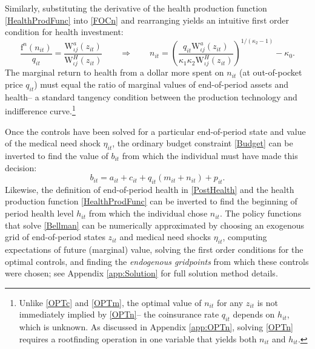 \documentclass[12pt,pdftex,letterpaper]{article}
\newcommand{\Health}{h}
\newcommand{\PostHealth}{H}
\newcommand{\PostValue}{\text{W}}
\newcommand{\Con}{c}
\newcommand{\Care}{m}
\newcommand{\Invst}{n}
\newcommand{\Bank}{b}
\newcommand{\Assets}{a}
\newcommand{\Premium}{p}
\newcommand{\Copay}{q}
\newcommand{\MedShk}{\eta}
\newcommand{\HealthProdFunc}{\text{f}}
\newcommand{\HealthProdParam}{\kappa}
\newcommand{\PostState}{z}
\begin{document}
Similarly, substituting the derivative of the health production function \eqref{HealthProdFunc} into \eqref{FOCn} and rearranging yields an intuitive first order condition for health investment:
\begin{equation}\label{OPTn}
\frac{\HealthProdFunc^\Invst (\Invst_{it})}{\Copay_{it}} = \frac{\PostValue_{\iota j}^\Assets(\PostState_{it})}{\PostValue_{\iota j}^\PostHealth(\PostState_{it})}
\qquad \Longrightarrow \qquad
\Invst_{it} = \left( \frac{\Copay_{it} \PostValue_{\iota j}^\Assets(\PostState_{it})}{\HealthProdParam_1 \HealthProdParam_2 \PostValue_{\iota j}^\PostHealth(\PostState_{it})} \right)^{1/(\HealthProdParam_2 - 1)} - \HealthProdParam_0.
\end{equation}
The marginal return to health from a dollar more spent on $\Invst_{it}$ (at out-of-pocket price $\Copay_{it}$) must equal the ratio of marginal values of end-of-period assets and health-- a standard tangency condition between the production technology and indifference curve.\footnote{Unlike \eqref{OPTc} and \eqref{OPTm}, the optimal value of $\Invst_{it}$ for any $\PostState_{it}$ is not immediately implied by \eqref{OPTn}-- the coinsurance rate $\Copay_{it}$ depends on $\Health_{it}$, which is unknown. As discussed in Appendix \ref{app:OPTn}, solving \eqref{OPTn} requires a rootfinding operation in one variable that yields both $\Invst_{it}$ and $\Health_{it}$.}

Once the controls have been solved for a particular end-of-period state and value of the medical need shock $\MedShk_{it}$, the ordinary budget constraint \eqref{Budget} can be inverted to find the value of $\Bank_{it}$ from which the individual must have made this decision:
\begin{equation}\label{BudgetEGM}
\Bank_{it} = \Assets_{it} + \Con_{it} + \Copay_{it} (\Care_{it} + \Invst_{it}) + \Premium_{it}.
\end{equation}
Likewise, the definition of end-of-period health in \eqref{PostHealth} and the health production function \eqref{HealthProdFunc} can be inverted to find the beginning of period health level $\Health_{it}$ from which the individual chose $\Invst_{it}$.  The policy functions that solve \eqref{Bellman} can be numerically approximated by choosing an exogenous grid of end-of-period states $\PostState_{it}$ and medical need shocks $\MedShk_{it}$, computing expectations of future (marginal) value, solving the first order conditions for the optimal controls, and finding the \textit{endogenous gridpoints} from which these controls were chosen; see Appendix \ref{app:Solution} for full solution method details.
\end{document}
